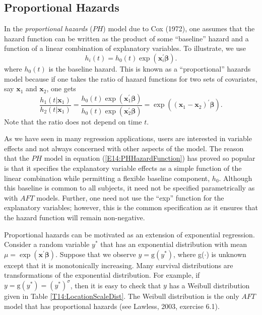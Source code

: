 \subsection{Proportional Hazards}\label{S14:PHAssumption}


In the \emph{proportional hazards} ($PH$) model due to Cox (1972),
one assumes that the hazard function can be written as the product
of some ``baseline'' hazard and a function of a linear combination
of explanatory variables. To illustrate, we use
\begin{equation}\label{E14:PHHazardFunction}
h_i(t) = h_0(t) \exp( \mathbf{x}_i^{\prime} \boldsymbol \beta ).
\end{equation}
where $h_0(t)$ is the baseline hazard. This is known as a
``proportional'' hazards model because if one takes the ratio of
hazard functions for two sets of covariates, say $\mathbf{x}_1$ and
$\mathbf{x}_2$, one gets
\begin{equation*}
\frac{h_1(t|\mathbf{x}_1)}{h_2(t|\mathbf{x}_1)} = \frac {h_0(t)
\exp( \mathbf{x}_1^{\prime} \boldsymbol \beta )} {h_0(t) \exp(
\mathbf{x}_2^{\prime} \boldsymbol \beta )} = \exp(
(\mathbf{x}_1-\mathbf{x}_2)^{\prime}\boldsymbol \beta ) .
\end{equation*}
Note that the ratio does not depend on time $t$.

As we have seen in many regression applications, users are
interested in variable effects and not always concerned with other
aspects of the model. The reason that the $PH$ model in equation
(\ref{E14:PHHazardFunction}) has proved so popular is that it
specifies the explanatory variable effects as a simple function of
the linear combination while permitting a flexible baseline
component, $h_0$. Although this baseline is common to all subjects,
it need not be specified parametrically as with $AFT$ models.
Further, one need not use the ``exp'' function for the explanatory
variables; however, this is the common specification as it ensures
that the hazard function will remain non-negative.

Proportional hazards can be motivated as an extension of exponential
regression. Consider a random variable $y^{\ast}$ that has an
exponential distribution with mean $\mu = \exp (\mathbf{x}^{\prime}
\boldsymbol \beta)$. Suppose that we observe $y =
\mathrm{g}(y^{\ast})$, where g($\cdot$) is unknown except that it is
monotonically increasing. Many survival distributions are
transformations of the exponential distribution. For example, if $y
= \mathrm{g}(y^{\ast})=(y^{\ast})^{\sigma}$, then it is easy to
check that $y$ has a Weibull distribution given in Table
\ref{T14:LocationScaleDist}. The Weibull distribution is the only
$AFT$ model that has proportional hazards (see Lawless, 2003,
exercise 6.1).

